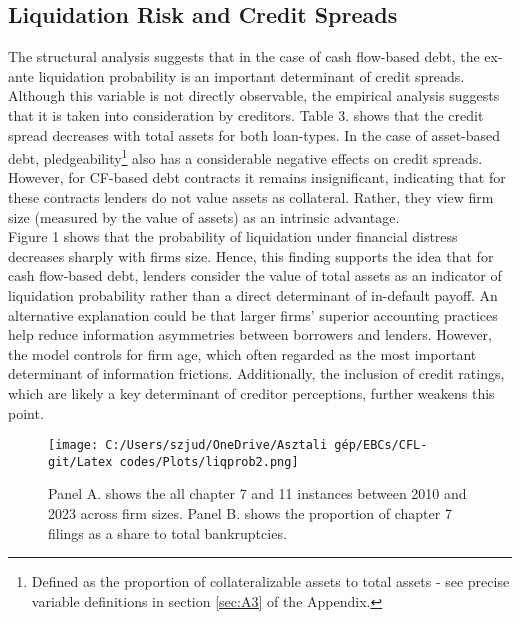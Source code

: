 \documentclass[12pt]{article}
\begin{document}
\subsection{Liquidation Risk and Credit Spreads \label{sec:emp liqprob}} 
The structural analysis suggests that in the case of cash flow-based debt, the ex-ante liquidation probability is an important determinant of credit spreads. Although this variable is not directly observable, the empirical analysis suggests that it is taken into consideration by creditors. Table 3. shows that the credit spread decreases with total assets for both loan-types. In the case of asset-based debt, pledgeability\footnote{Defined as the proportion of collateralizable assets to total assets - see precise variable definitions in section \ref{sec:A3} of the Appendix.} also has a considerable negative effects on credit spreads. However, for CF-based debt contracts it remains insignificant, indicating that for these contracts lenders do not value assets as collateral. Rather, they view firm size (measured by the value of assets) as an intrinsic advantage. \vspace{3mm} \\
Figure 1 shows that the probability of liquidation under financial distress decreases sharply with firms size. Hence, this finding supports the idea that for cash flow-based debt, lenders consider the value of total assets as an indicator of liquidation probability rather than a direct determinant of in-default payoff. An alternative explanation could be that larger firms’ superior accounting practices help reduce information asymmetries between borrowers and lenders. However, the model controls for firm age, which often regarded as the most important determinant of information frictions. Additionally, the inclusion of credit ratings, which are likely a key determinant of creditor perceptions, further weakens this point.
\begin{figure}[H]  %
    \centering  \label{chart:mixplot}
    \texttt{[image: C:/Users/szjud/OneDrive/Asztali gép/EBCs/CFL-git/Latex codes/Plots/liqprob2.png]}
    \caption{ \small Panel A. shows the all chapter 7 and 11 instances between 2010 and 2023 across firm sizes. Panel B. shows the proportion of chapter 7 filings as a share to total bankruptcies.}
\end{figure}
\end{document}
